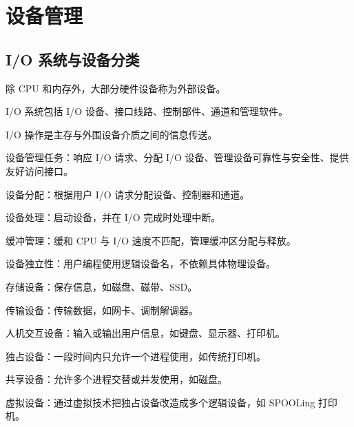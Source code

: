 \chapter{设备管理}

\section{I/O 系统与设备分类}
\begin{points}
  \item 除 CPU 和内存外，大部分硬件设备称为外部设备。
  \item I/O 系统包括 I/O 设备、接口线路、控制部件、通道和管理软件。
  \item I/O 操作是主存与外围设备介质之间的信息传送。
  \item 设备管理任务：响应 I/O 请求、分配 I/O 设备、管理设备可靠性与安全性、提供友好访问接口。
\end{points}


\begin{points}
  \item 设备分配：根据用户 I/O 请求分配设备、控制器和通道。
  \item 设备处理：启动设备，并在 I/O 完成时处理中断。
  \item 缓冲管理：缓和 CPU 与 I/O 速度不匹配，管理缓冲区分配与释放。
  \item 设备独立性：用户编程使用逻辑设备名，不依赖具体物理设备。
\end{points}


\begin{points}
  \item 存储设备：保存信息，如磁盘、磁带、SSD。
  \item 传输设备：传输数据，如网卡、调制解调器。
  \item 人机交互设备：输入或输出用户信息，如键盘、显示器、打印机。
\end{points}


\begin{points}
  \item 独占设备：一段时间内只允许一个进程使用，如传统打印机。
  \item 共享设备：允许多个进程交替或并发使用，如磁盘。
  \item 虚拟设备：通过虚拟技术把独占设备改造成多个逻辑设备，如 SPOOLing 打印机。
\end{points}


